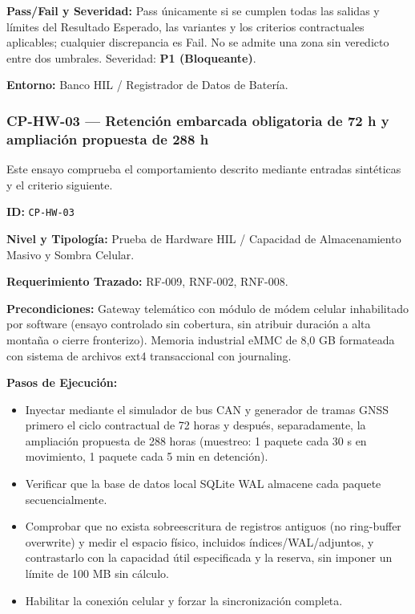 \par\noindent\textbf{Pass/Fail y Severidad:} Pass únicamente si se cumplen todas las salidas y límites del Resultado Esperado, las variantes y los criterios contractuales aplicables; cualquier discrepancia es Fail. No se admite una zona sin veredicto entre dos umbrales. Severidad: \textbf{P1 (Bloqueante)}.\par
\par\noindent\textbf{Entorno:} Banco HIL / Registrador de Datos de Batería.\par






\subsubsection*{CP-HW-03 — Retención embarcada obligatoria de 72 h y ampliación propuesta de 288 h}\label{sec:9-cp-hw-03}

Este ensayo comprueba el comportamiento descrito mediante entradas sintéticas y el criterio siguiente.

\par\noindent\textbf{ID:} \texttt{CP-\allowbreak{}HW-\allowbreak{}03}\par
\par\noindent\textbf{Nivel y Tipología:} Prueba de Hardware HIL / Capacidad de Almacenamiento Masivo y Sombra Celular.\par
\par\noindent\textbf{Requerimiento Trazado:} RF-009, RNF-002, RNF-008.\par
\par\noindent\textbf{Precondiciones:} Gateway telemático con módulo de módem celular inhabilitado por software (ensayo controlado sin cobertura, sin atribuir duración a alta montaña o cierre fronterizo). Memoria industrial eMMC de 8,0 GB formateada con sistema de archivos ext4 transaccional con journaling.\par
\par\noindent\textbf{Pasos de Ejecución:}\par
\begin{itemize}
\item Inyectar mediante el simulador de bus CAN y generador de tramas GNSS primero el ciclo contractual de 72 horas y después, separadamente, la ampliación propuesta de 288 horas (muestreo: 1 paquete cada 30 s en movimiento, 1 paquete cada 5 min en detención).
\item Verificar que la base de datos local SQLite WAL almacene cada paquete secuencialmente.
\item Comprobar que no exista sobreescritura de registros antiguos (no ring-buffer overwrite) y medir el espacio físico, incluidos índices/WAL/adjuntos, y contrastarlo con la capacidad útil especificada y la reserva, sin imponer un límite de 100 MB sin cálculo.
\item Habilitar la conexión celular y forzar la sincronización completa.
\end{itemize}

